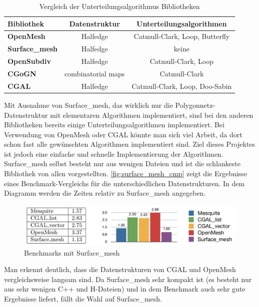 \begin{table}
\center
\caption{Vergleich der Unterteilungsalgorithmus Bibliotheken}
\begin{tabular}{l|c|c}
\textbf{Bibliothek} & \textbf{Datenstruktur} & \textbf{Unterteilungsalgorithmen}\\
\hline
\textbf{OpenMesh} & Halfedge & Catmull-Clark, Loop, Butterfly\\
\textbf{Surface\_mesh} & Halfedge & keine\\
\textbf{OpenSubdiv} & Halfedge & Catmull-Clark, Loop\\
\textbf{CGoGN} & combinatorial maps & Catmull-Clark\\
\textbf{\ac{CGAL}} & Halfedge & Catmull-Clark, Loop, Doo-Sabin\\
\end{tabular}
\label{tab:sd_bib}
\end{table}

Mit Ausnahme von Surface\_mesh, das wirklich nur die Polygonnetz-Datenstruktur mit elementaren Algorithmen implementiert, sind bei den anderen Bibliotheken bereits
einige Unterteilungsalgorithmen implementiert.
Bei Verwendung von OpenMesh oder CGAL könnte man sich viel Arbeit, da dort schon fast alle gewünschten Algorithmen implementiert sind.
Ziel dieses Projektes ist jedoch eine einfache und schnelle Implementierung der Algorithmen.
Surface\_mesh selbst besteht nur aus wenigen Dateien und ist die schlankeste Bibliothek von allen vorgestellten.
\autoref{fig:surface_mesh_cmp} zeigt die Ergebnisse eines Benchmark-Vergleichs für die unterschiedlichen Datenstrukturen.
In dem Diagramm werden die Zeiten relativ zu Surface\_mesh angegeben.

\begin{figure}
  \centering
  \includegraphics[width=1.0\textwidth]{content/media/surface_mesh_cmp}
   \caption{Benchmarks mit Surface\_mesh \cite{Sieger.}}
  \label{fig:surface_mesh_cmp}
\end{figure}

Man erkennt deutlich, dass die Datenstrukturen von \ac{CGAL} und OpenMesh vergleichsweise langsam sind.
Da Surface\_mesh sehr kompakt ist (es besteht nur aus sehr wenigen C++ und H-Dateien) und in dem Benchmark auch sehr gute Ergebnisse liefert, fällt die Wahl auf Surface\_mesh.


